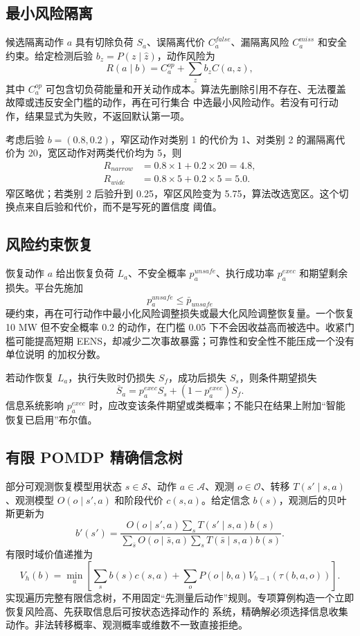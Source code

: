 \subsection{最小风险隔离}
候选隔离动作 $a$ 具有切除负荷 $S_a$、误隔离代价 $C_a^{false}$、漏隔离风险 $C_a^{miss}$ 和安全约束。给定检测后验
$b_z=P(z\mid\widehat z)$，动作风险为
\begin{equation}
 R(a\mid b)=C_a^{op}+\sum_zb_z C(a,z),
\end{equation}
其中 $C_a^{op}$ 可包含切负荷能量和开关动作成本。算法先删除引用不存在、无法覆盖故障或违反安全门槛的动作，再在可行集合
中选最小风险动作。若没有可行动作，结果显式为失败，不返回默认第一项。

考虑后验 $b=(0.8,0.2)$，窄区动作对类别 1 的代价为 1、对类别 2 的漏隔离代价为 20，宽区动作对两类代价均为 5，则
\begin{align}
 R_{narrow}&=0.8\times1+0.2\times20=4.8,\\
 R_{wide}&=0.8\times5+0.2\times5=5.0.
\end{align}
窄区略优；若类别 2 后验升到 0.25，窄区风险变为 5.75，算法改选宽区。这个切换点来自后验和代价，而不是写死的置信度
阈值。

\subsection{风险约束恢复}
恢复动作 $a$ 给出恢复负荷 $L_a$、不安全概率 $p_a^{unsafe}$、执行成功率 $p_a^{exec}$ 和期望剩余损失。平台先施加
\begin{equation}
 p_a^{unsafe}\le\bar p_{unsafe}
\end{equation}
硬约束，再在可行动作中最小化风险调整损失或最大化风险调整恢复量。一个恢复 10 MW 但不安全概率 0.2 的动作，在门槛
0.05 下不会因收益高而被选中。收紧门槛可能提高短期 EENS，却减少二次事故暴露；可靠性和安全性不能压成一个没有单位说明
的加权分数。

若动作恢复 $L_a$，执行失败时仍损失 $S_f$，成功后损失 $S_s$，则条件期望损失
\begin{equation}
 \overline S_a=p_a^{exec}S_s+(1-p_a^{exec})S_f.
\end{equation}
信息系统影响 $p_a^{exec}$ 时，应改变该条件期望或类概率；不能只在结果上附加“智能恢复已启用”布尔值。

\subsection{有限 POMDP 精确信念树}
部分可观测恢复模型用状态 $s\in\mathcal S$、动作 $a\in\mathcal A$、观测 $o\in\mathcal O$、转移
$T(s'\mid s,a)$、观测模型 $O(o\mid s',a)$ 和阶段代价 $c(s,a)$。给定信念 $b(s)$，观测后的贝叶斯更新为
\begin{equation}
 b'(s')=\frac{O(o\mid s',a)\sum_sT(s'\mid s,a)b(s)}
 {\sum_{\bar s}O(o\mid\bar s,a)\sum_sT(\bar s\mid s,a)b(s)}.
\end{equation}
有限时域价值递推为
\begin{equation}
 V_h(b)=\min_a\left[\sum_sb(s)c(s,a)+
 \sum_oP(o\mid b,a)V_{h-1}(\tau(b,a,o))\right].
\end{equation}
实现遍历完整有限信念树，不用固定“先测量后动作”规则。专项算例构造一个立即恢复风险高、先获取信息后可按状态选择动作的
系统，精确解必须选择信息收集动作。非法转移概率、观测概率或维数不一致直接拒绝。

